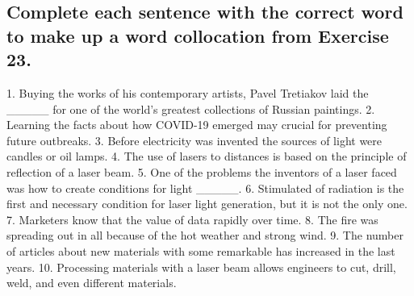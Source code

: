 \subsection*{Complete each sentence with the correct word to make up a word collocation
      from Exercise 23.}
1. Buying the works of his contemporary artists, Pavel Tretiakov laid the \_\_\_\_\_
for one of the world’s greatest collections of Russian paintings. 2. Learning the facts
about how COVID-19 emerged may \underline{\hspace{2cm}} crucial for preventing future outbreaks. 3.
Before electricity was invented the \underline{\hspace{2cm}} sources of light were candles or oil
lamps. 4. The use of lasers to \underline{\hspace{2cm}} distances is based on the principle of
reflection of a laser beam. 5. One of the problems the inventors of a laser faced was
how to create conditions for light \_\_\_\_\_. 6. Stimulated \underline{\hspace{2cm}} of radiation
is the first and necessary condition for laser light generation, but it is not the only
one. 7. Marketers know that the value of data \underline{\hspace{2cm}} rapidly over time. 8. The
fire was spreading out in all \underline{\hspace{2cm}} because of the hot weather and strong wind. 9.
The number of articles about new materials with some remarkable \underline{\hspace{2cm}} has increased
in the last years. 10. Processing materials with a laser beam allows engineers to cut,
drill, weld, and even \underline{\hspace{2cm}} different materials.

